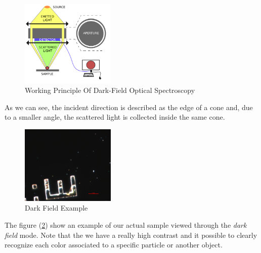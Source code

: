 \documentclass{article}
\numberwithin{equation}{section}
\begin{document}
\begin{figure}[h!]
    \centering
    \includegraphics[width=0.4\textwidth, height=0.37\textwidth]{dark_field_working.png}
    \caption{Working Principle Of Dark-Field Optical Spectroscopy}
    \label{fig:dark_field_working}
\end{figure}
As we can see, the incident direction is described as the edge of a cone and, due to a smaller angle, the scattered light is collected inside the same cone.
\begin{figure}[h!]
    \centering
    \includegraphics[width=0.4\textwidth, height=0.35\textwidth]{dark_field_ex.png}
    \caption{Dark Field Example}
    \label{fig:dark_field_ex}
\end{figure}
The figure (\ref{fig:dark_field_ex}) show an example of our actual sample viewed through the \textit{dark field} mode. Note that the we have a really high contrast and it possible to clearly recognize each color associated to a specific particle or another object.
\end{document}
